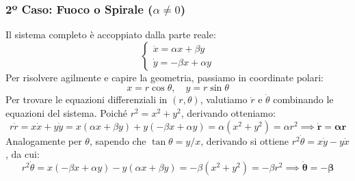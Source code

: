 \documentclass[openany]{book}
\theoremstyle{definition}
\theoremstyle{remark}
\begin{document}
\begin{center}
\end{center}

\subsubsection*{2º Caso: Fuoco o Spirale ($\alpha \neq 0$)}
Il sistema completo è accoppiato dalla parte reale:
\begin{equation}
    \begin{cases}
        \dot{x} = \alpha x + \beta y \\
        \dot{y} = -\beta x + \alpha y
    \end{cases}
\end{equation}
Per risolvere agilmente e capire la geometria, passiamo in coordinate polari:
\begin{equation}
    x = r\cos\theta, \quad y = r\sin\theta
\end{equation}
Per trovare le equazioni differenziali in $(r, \theta)$, valutiamo $\dot{r}$ e $\dot{\theta}$ combinando le equazioni del sistema. Poiché $r^2 = x^2 + y^2$, derivando otteniamo:
\begin{equation*}
    r\dot{r} = x\dot{x} + y\dot{y} = x(\alpha x + \beta y) + y(-\beta x + \alpha y) = \alpha(x^2 + y^2) = \alpha r^2 \implies \mathbf{\dot{r} = \alpha r}
\end{equation*}
Analogamente per $\theta$, sapendo che $\tan\theta = y/x$, derivando si ottiene $r^2\dot{\theta} = x\dot{y} - y\dot{x}$, da cui:
\begin{equation*}
    r^2\dot{\theta} = x(-\beta x + \alpha y) - y(\alpha x + \beta y) = -\beta(x^2 + y^2) = -\beta r^2 \implies \mathbf{\dot{\theta} = -\beta}
\end{equation*}
\end{document}
